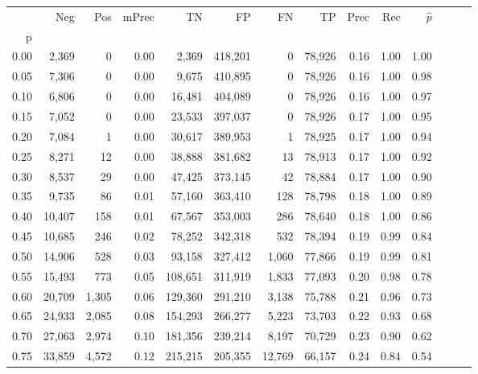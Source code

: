 \begin{tabular}{rrrrrrrrrrrrrr}
\toprule
{} &     Neg &     Pos & mPrec &       TN &       FP &      FN &      TP &  Prec &   Rec & $\hat{p}$ \\
p    &         &         &       &          &          &         &         &       &       &           \\
\midrule
0.00 &   2,369 &       0 &  0.00 &    2,369 &  418,201 &       0 &  78,926 &  0.16 &  1.00 &      1.00 \\
0.05 &   7,306 &       0 &  0.00 &    9,675 &  410,895 &       0 &  78,926 &  0.16 &  1.00 &      0.98 \\
0.10 &   6,806 &       0 &  0.00 &   16,481 &  404,089 &       0 &  78,926 &  0.16 &  1.00 &      0.97 \\
0.15 &   7,052 &       0 &  0.00 &   23,533 &  397,037 &       0 &  78,926 &  0.17 &  1.00 &      0.95 \\
0.20 &   7,084 &       1 &  0.00 &   30,617 &  389,953 &       1 &  78,925 &  0.17 &  1.00 &      0.94 \\
0.25 &   8,271 &      12 &  0.00 &   38,888 &  381,682 &      13 &  78,913 &  0.17 &  1.00 &      0.92 \\
0.30 &   8,537 &      29 &  0.00 &   47,425 &  373,145 &      42 &  78,884 &  0.17 &  1.00 &      0.90 \\
0.35 &   9,735 &      86 &  0.01 &   57,160 &  363,410 &     128 &  78,798 &  0.18 &  1.00 &      0.89 \\
0.40 &  10,407 &     158 &  0.01 &   67,567 &  353,003 &     286 &  78,640 &  0.18 &  1.00 &      0.86 \\
0.45 &  10,685 &     246 &  0.02 &   78,252 &  342,318 &     532 &  78,394 &  0.19 &  0.99 &      0.84 \\
0.50 &  14,906 &     528 &  0.03 &   93,158 &  327,412 &   1,060 &  77,866 &  0.19 &  0.99 &      0.81 \\
0.55 &  15,493 &     773 &  0.05 &  108,651 &  311,919 &   1,833 &  77,093 &  0.20 &  0.98 &      0.78 \\
0.60 &  20,709 &   1,305 &  0.06 &  129,360 &  291,210 &   3,138 &  75,788 &  0.21 &  0.96 &      0.73 \\
0.65 &  24,933 &   2,085 &  0.08 &  154,293 &  266,277 &   5,223 &  73,703 &  0.22 &  0.93 &      0.68 \\
0.70 &  27,063 &   2,974 &  0.10 &  181,356 &  239,214 &   8,197 &  70,729 &  0.23 &  0.90 &      0.62 \\
0.75 &  33,859 &   4,572 &  0.12 &  215,215 &  205,355 &  12,769 &  66,157 &  0.24 &  0.84 &      0.54 \\

\end{tabular}
